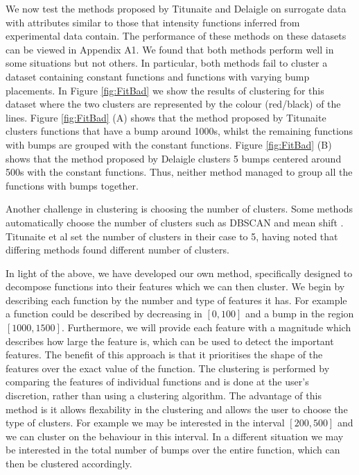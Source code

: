 \documentclass[12pt]{book} %
\begin{document}
 We now test the methods proposed by Titunaite and Delaigle on surrogate data with attributes similar to those that intensity functions inferred from experimental data contain. The performance of these methods on these datasets can be viewed in Appendix $\text{}$A1. We found that both methods perform well in some situations but not others. In particular, both methods fail to cluster a dataset containing constant functions and functions with varying bump placements. In Figure \ref{fig:FitBad} we show the results of clustering for this dataset where the two clusters are represented by the colour (red/black) of the lines. Figure \ref{fig:FitBad} (A) shows that the method proposed by Titunaite clusters functions that have a bump around 1000s, whilst the remaining functions with bumps are grouped with the constant functions. Figure \ref{fig:FitBad} (B) shows that the method proposed by Delaigle clusters 5 bumps centered around 500s with the constant functions. Thus, neither method managed to group all the functions with bumps together. 
 
 Another challenge in clustering is choosing the number of clusters. Some methods automatically choose the number of clusters such as DBSCAN and mean shift \cite{}. Titunaite et al set the number of clusters in their case to 5, having noted that differing methods found different number of clusters.   
 
 In light of the above, we have developed our own method, specifically designed to decompose functions into their features which we can then cluster. We begin by describing each function by the number and type of features it has. For example a function could be described by decreasing in $[0,100]$ and a bump in the region $[1000,1500]$. Furthermore, we will provide each feature with a magnitude which describes how large the feature is, which can be used to detect the important features. The benefit of this approach is that it prioritises the shape of the features over the exact value of the function. 
 The clustering is performed by comparing the features of individual functions and is done at the user's discretion, rather than using a clustering algorithm. The advantage of this method is it allows flexability in the clustering and allows the user to choose the type of clusters. For example we	 may be interested in the interval $[200,500]$ and we can cluster on the behaviour in this interval. In a different situation we may be interested in the total number of bumps over the entire function, which can then be clustered accordingly. 
 
\end{document}
